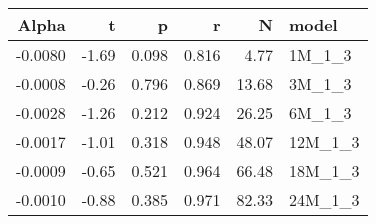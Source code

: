 \begin{table}[ht]
\centering
\begin{tabular}{rrrrrl}
  \hline
Alpha & t & p & r & N & model \\ 
  \hline
-0.0080 & -1.69 & 0.098 & 0.816 & 4.77 & 1M\_1\_3 \\ 
  -0.0008 & -0.26 & 0.796 & 0.869 & 13.68 & 3M\_1\_3 \\ 
  -0.0028 & -1.26 & 0.212 & 0.924 & 26.25 & 6M\_1\_3 \\ 
  -0.0017 & -1.01 & 0.318 & 0.948 & 48.07 & 12M\_1\_3 \\ 
  -0.0009 & -0.65 & 0.521 & 0.964 & 66.48 & 18M\_1\_3 \\ 
  -0.0010 & -0.88 & 0.385 & 0.971 & 82.33 & 24M\_1\_3 \\ 
   \hline
\end{tabular}
\end{table}

